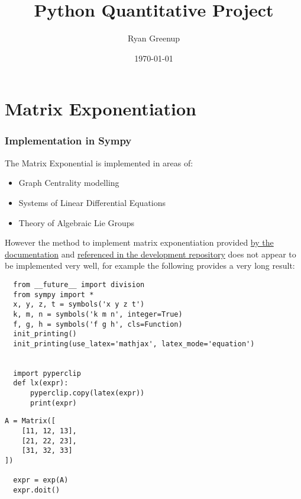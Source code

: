 \documentclass[11pt]{article}
\author{Ryan Greenup}
\date{\today}
\title{Python Quantitative Project}
\begin{document}
\maketitle
\tableofcontents

\section{Matrix Exponentiation}
\label{sec:org042a657}
\subsubsection{Implementation in Sympy}
\label{sec:org0709426}
The Matrix Exponential is implemented in areas of:

\begin{itemize}
\item Graph Centrality modelling \cite{parkPowerWalkRevisiting2013}
\item Systems of Linear Differential Equations \cite[Ch. 8.4]{Zil2009}
\item Theory of Algebraic Lie Groups \cite[Ch. 2]{hallLieGroupsLie2015}
\end{itemize}

However the method to implement matrix exponentiation provided \href{https://docs.sympy.org/latest/tutorial/matrices.html}{by the documentation} \cite{MatricesSymPyDocumentation2020} and \href{https://github.com/sympy/sympy/issues/6218}{referenced in the development repository} \cite{MatrixExponentialIssue2019} does not appear to be implemented very well, for example the following provides a very long result:

\begin{verbatim}
  from __future__ import division
  from sympy import *
  x, y, z, t = symbols('x y z t')
  k, m, n = symbols('k m n', integer=True)
  f, g, h = symbols('f g h', cls=Function)
  init_printing()
  init_printing(use_latex='mathjax', latex_mode='equation')


  import pyperclip
  def lx(expr):
      pyperclip.copy(latex(expr))
      print(expr)
\end{verbatim}

\begin{verbatim}
A = Matrix([
    [11, 12, 13],
    [21, 22, 23],
    [31, 32, 33]
])

  expr = exp(A)
  expr.doit()
\end{verbatim}
\end{document}
